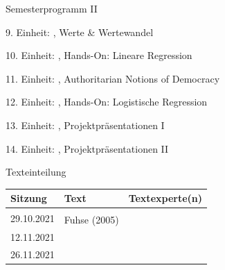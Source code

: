 \documentclass[11pt]{beamer}
\begin{document}
\begin{frame}[t]{Semesterprogramm II}
	\begin{nolist}
		\item[9.] Einheit: , Werte \& Wertewandel		
		\item[10.] Einheit: , Hands-On: Lineare Regression \pause
		\item[11.] Einheit: , Authoritarian Notions of Democracy
		\item[12.] Einheit: , Hands-On: Logistische Regression \pause
		\item[13.] Einheit: , Projektpräsentationen I
		\item[14.] Einheit: , Projektpräsentationen II 
	\end{nolist}
\end{frame}

\begin{frame}[t]{Texteinteilung}
	\begin{center}	
		\begin{table}
			\begin{tabular}{l l l}
			\toprule[2pt]
			Sitzung & Text & Textexperte(n)\\
			\midrule
			\multirow{2}{*}{29.10.2021} &\cite{Easton1975} & \\
			\cmidrule{2-3}
			& Fuhse (2005) & \\
			\midrule
			\multirow{3}{*}{12.11.2021} & \cite[Kap. 1]{Almond1963} & \\
			\cmidrule{2-3}
			& \cite[Kap. 15]{Almond1963} & \\
			\cmidrule{2-3}
			& \cite{Gabriel2009} & \\
			\midrule
			\multirow{4}{*}{26.11.2021} & \cite{Festenstein2019} & \\
			\cmidrule{2-3}
			& \cite{Zmerli2020}  & \\
			\cmidrule{2-3}
			& \cite{Hooghe2017} & \\
			\bottomrule[2pt]
			\end{tabular}
		\end{table}
	\end{center}
\end{frame}
\end{document}
